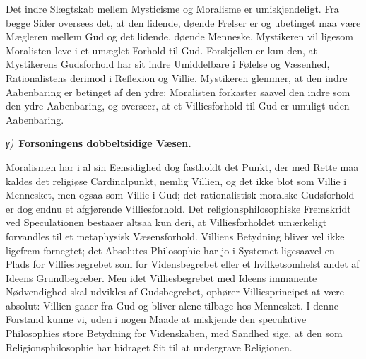 \documentclass[12pt]{book}
\newcommand{\greekrun}[2]{%
  \medskip\begin{center}{\itshape #1)}\ {\bfseries #2}\end{center}\medskip}
\begin{document}
Det indre Slægtskab mellem Mysticisme og Moralisme er
umiskjendeligt. Fra begge Sider oversees det, at den lidende, døende
Frelser er og ubetinget maa være Mægleren mellem Gud og det lidende,
døende Menneske. Mystikeren vil ligesom Moralisten leve i et umæglet
Forhold til Gud. Forskjellen er kun den, at Mystikerens Gudsforhold
har sit indre Umiddelbare i Følelse og Væsenhed, Rationalistens
derimod i Reflexion og Villie. Mystikeren glemmer, at den indre
Aabenbaring er betinget af den ydre; Moralisten forkaster saavel den
indre
som den ydre Aabenbaring, og overseer, at et Villiesforhold til Gud
er umuligt uden Aabenbaring.

\greekrun{γ}{Forsoningens dobbeltsidige Væsen.}

Moralismen har i al sin Eensidighed dog fastholdt det Punkt, der med
Rette maa kaldes det religiøse Cardinalpunkt, nemlig Villien, og det
ikke blot som Villie i Mennesket, men ogsaa som Villie i Gud; det
rationalistisk-moralske Gudsforhold er dog endnu et afgjørende
Villiesforhold. Det religionsphilosophiske Fremskridt ved
Speculationen bestaaer altsaa kun deri, at Villiesforholdet
umærkeligt forvandles til et metaphysisk Væsensforhold. Villiens
Betydning bliver vel ikke ligefrem fornegtet; det Absolutes
Philosophie har jo i Systemet ligesaavel en Plads for
Villiesbegrebet som for Vidensbegrebet eller et hvilketsomhelst
andet af Ideens Grundbegreber. Men idet Villiesbegrebet med Ideens
immanente Nødvendighed skal udvikles af Gudsbegrebet, ophører
Villiesprincipet at være absolut: Villien gaaer fra Gud og bliver
alene tilbage hos Mennesket. I denne Forstand kunne vi, uden i nogen
Maade at miskjende den speculative Philosophies store Betydning for
Videnskaben, med Sandhed sige, at den som Religionsphilosophie har
bidraget Sit til at undergrave Religionen.
\end{document}
